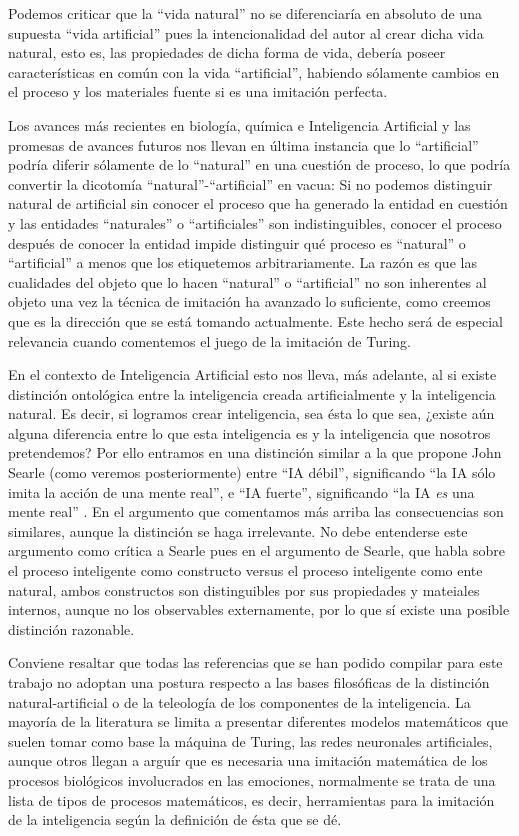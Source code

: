 \documentclass[12pt]{memoir}
\begin{document}
Podemos criticar que la ``vida natural'' no se diferenciaría en absoluto de una supuesta ``vida artificial'' pues la intencionalidad del autor al crear dicha vida natural, esto es, las propiedades de dicha forma de vida, debería poseer características en común con la vida ``artificial'', habiendo sólamente cambios en el proceso y los materiales fuente si es una imitación perfecta. 

Los avances más recientes en biología, química e Inteligencia Artificial y las promesas de avances futuros nos llevan en última instancia que lo ``artificial'' podría diferir sólamente de lo ``natural'' en una cuestión de proceso, lo que podría convertir la dicotomía ``natural''-``artificial'' en vacua: Si no podemos distinguir natural de artificial sin conocer el proceso que ha generado la entidad en cuestión y las entidades ``naturales'' o ``artificiales'' son indistinguibles, conocer el proceso después de conocer la entidad impide distinguir qué proceso es ``natural'' o ``artificial'' a menos que los etiquetemos arbitrariamente. La razón es que las cualidades del objeto que lo hacen ``natural'' o ``artificial'' no son inherentes al objeto una vez la técnica de imitación ha avanzado lo suficiente, como creemos que es la dirección que se está tomando actualmente. Este hecho será de especial relevancia cuando comentemos el juego de la imitación de Turing.

En el contexto de Inteligencia Artificial esto nos lleva, más adelante, al si existe distinción ontológica entre la inteligencia creada artificialmente y la inteligencia natural. Es decir, si logramos crear inteligencia, sea ésta lo que sea, ¿existe aún alguna diferencia entre lo que esta inteligencia es y la inteligencia que nosotros pretendemos? Por ello entramos en una distinción similar a la que propone John Searle (como veremos posteriormente) entre ``IA débil'', significando ``la IA sólo imita la acción de una mente real'', e ``IA fuerte'', significando ``la IA \textit{es} una mente real'' \parencite{searleChineseRoom}. En el argumento que comentamos más arriba las consecuencias son similares, aunque la distinción se haga irrelevante. No debe entenderse este argumento como crítica a Searle pues en el argumento de Searle, que habla sobre el proceso inteligente como constructo versus el proceso inteligente como ente natural, ambos constructos son distinguibles por sus propiedades y mateiales internos, aunque no los observables externamente, por lo que sí existe una posible distinción razonable.

Conviene resaltar que todas las referencias que se han podido compilar para este trabajo no adoptan una postura respecto a las bases filosóficas de la distinción natural-artificial o de la teleología de los componentes de la inteligencia. La mayoría de la literatura se limita a presentar diferentes modelos matemáticos que suelen tomar como base la máquina de Turing, las redes neuronales artificiales, aunque otros llegan a arguír que es necesaria una imitación matemática de los procesos biológicos involucrados en las emociones, normalmente se trata de una lista de tipos de procesos matemáticos, es decir, herramientas para la imitación de la inteligencia según la definición de ésta que se dé.
\end{document}
